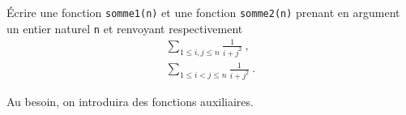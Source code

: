 \exer{}
\setcounter{numques}{0}

\question{} Écrire une fonction \texttt{somme1(n)} et une fonction \texttt{somme2(n)} prenant en argument
un entier naturel \texttt{n} et renvoyant respectivement
\begin{gather}
  \sum_{1\leq i,j\leq n} \frac{1}{i+j^{2}}~, \\
  \sum_{1\leq i<j\leq n} \frac{1}{i+j^{2}}~.
\end{gather}

Au besoin, on introduira des fonctions auxiliaires.